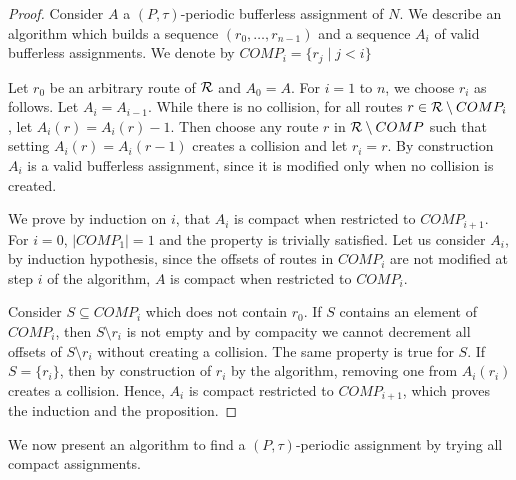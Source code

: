 \begin{proof}
Consider $A$ a $(P,\tau)$-periodic bufferless assignment of $N$.
We describe an algorithm which builds a sequence $(r_0,\dots,r_{n-1})$ and a sequence  
$A_i$ of valid bufferless assignments. We denote by $COMP_i = \{ r_j \mid j < i\}$

Let $r_0$ be an arbitrary route of ${\cal R}$ and $A_0 = A$. For $i = 1$ to $n$, we choose $r_i$ as follows.
Let $A_{i} = A_{i-1}$. While there is no collision, for all routes $r \in {\cal R} \setminus COMP_i$, let $A_i(r) = A_i(r) - 1$. Then choose any route $r$ in ${\cal R} \setminus COMP$ such that setting $A_i(r) = A_i(r-1)$ creates a collision and let $r_i = r$. By construction $A_i$ is a valid bufferless assignment, since it is modified only when no collision is created.

We prove by induction on $i$, that $A_i$ is compact when restricted to $COMP_{i+1}$.
For $i = 0$, $|COMP_1| = 1$ and the property is trivially satisfied. Let us consider $A_i$,
by induction hypothesis, since the offsets of routes in $COMP_{i}$ are not modified at step $i$ of the algorithm, $A$ is compact when restricted to $COMP_{i}$. 

 Consider $S \subseteq COMP_i$ which does not contain $r_0$. If $S$ contains
an element of $COMP_{i}$, then $S \setminus {r_i}$ is not empty and by compacity we cannot decrement all offsets of $S\setminus {r_i}$ without creating a collision. The same property is true for $S$. If $S = \{r_i\}$, then by construction of $r_i$ by the algorithm, removing one from $A_i(r_i)$ creates a collision. Hence,
$A_i$ is compact restricted to $COMP_{i+1}$, which proves the induction and the proposition.
\end{proof}

We now present an algorithm to find a $(P,\tau)$-periodic assignment by trying all compact assignments.

